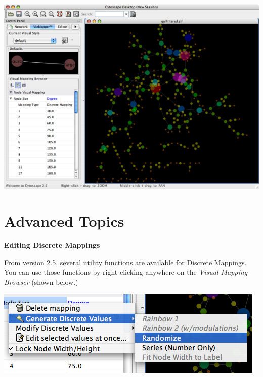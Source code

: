 \begin{enumerate}
 \includegraphics[width=.6\textwidth]{images/tutorial4_last.png} 


\end{enumerate}


 

\section*{Advanced Topics}


 \textbf{Editing Discrete Mappings}


 From version 2.5, several utility functions are available for Discrete Mappings. You can use those functions by right clicking anywhere on the \emph{Visual Mapping Browser}
 (shown below.) 


 \includegraphics[width=.6\textwidth]{images/VizMapperPopupMenu.png} 


